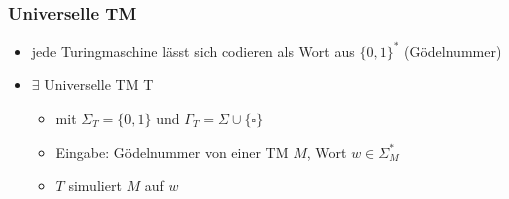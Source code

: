 \documentclass{beamer}
\begin{document}
\begin{frame}
\frametitle{Universelle TM}
\begin{itemize}
\item jede Turingmaschine lässt sich codieren als Wort aus $\{0,1\}^*$ (Gödelnummer)
\vspace{1cm}\pause
\item $\exists$ Universelle TM T
\begin{itemize}
\item mit $\Sigma_T=\{0,1\}$ und $\Gamma_T=\Sigma\cup\{\square\}$
\item Eingabe: Gödelnummer von einer TM $M$, Wort $w\in\Sigma_M^*$
\item $T$ simuliert $M$ auf $w$
\end{itemize}
\end{itemize}
\end{frame}
\end{document}
